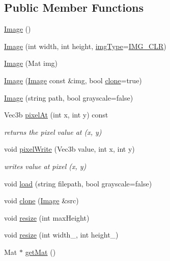 \subsection*{Public Member Functions}
\begin{DoxyCompactItemize}
\item 
\hyperlink{class_image_a58edd1c45b4faeb5f789b0d036d02313}{Image} ()
\item 
\hyperlink{class_image_a0b993f2b506ec12654cb275921127b00}{Image} (int width, int height, \hyperlink{class_image_a053e7160b6567c4929de1cae9a911581}{img\-Type}=\hyperlink{class_image_a053e7160b6567c4929de1cae9a911581a9a4b55aceff11e487f46b51cad901247}{I\-M\-G\-\_\-\-C\-L\-R})
\item 
\hyperlink{class_image_a583efff0899692314aa5a37fda3ec89e}{Image} (Mat img)
\item 
\hyperlink{class_image_ae714fa5c88b1b87e647d7f839c7bb24f}{Image} (\hyperlink{class_image}{Image} const \&img, bool \hyperlink{class_image_a2d48b9ae9b3e3bc254db7ee5b2cca0a4}{clone}=true)
\item 
\hyperlink{class_image_aab588538f35c49606ee9e7e51121d592}{Image} (string path, bool grayscale=false)
\item 
Vec3b \hyperlink{class_image_a9b183ad498d8ffea3f91a21e5a67920d}{pixel\-At} (int x, int y) const 
\begin{DoxyCompactList}\small\item\em returns the pixel value at (x, y) \end{DoxyCompactList}\item 
void \hyperlink{class_image_aec3c66b278ee2f0d0e12710627e97985}{pixel\-Write} (Vec3b value, int x, int y)
\begin{DoxyCompactList}\small\item\em writes value at pixel (x, y) \end{DoxyCompactList}\item 
void \hyperlink{class_image_a6750920d01caedc1a3782d9782df3cf1}{load} (string filepath, bool grayscale=false)
\item 
void \hyperlink{class_image_a2d48b9ae9b3e3bc254db7ee5b2cca0a4}{clone} (\hyperlink{class_image}{Image} \&src)
\item 
void \hyperlink{class_image_a3b2b0b209ce9fa05ac86e434635385b6}{resize} (int max\-Height)
\item 
void \hyperlink{class_image_a3c71a8e60be0adb70a9ee7aa2101f2a1}{resize} (int width\-\_\-, int height\-\_\-)
\item 
Mat $\ast$ \hyperlink{class_image_ac7db46ef48be05f16f1a48568609b2b7}{get\-Mat} ()

\end{DoxyCompactItemize}
